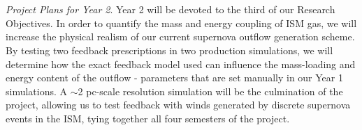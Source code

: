 \documentclass[11pt,letterpaper,english]{article}
\begin{document}
~\\~\\
\textit{Project Plans for Year 2}. Year 2 will be devoted to the third of our Research Objectives. In order to quantify the mass and energy coupling of ISM gas, we will increase the physical realism of our current supernova outflow generation scheme. By testing two feedback prescriptions in two production simulations, we will determine how the exact feedback model used can influence the mass-loading and energy content of the outflow - parameters that are set manually in our Year 1 simulations. A $\sim$2 pc-scale resolution simulation will be the culmination of the project, allowing us to test feedback with winds generated by discrete supernova events in the ISM, tying together all four semesters of the project.

\end{document}
